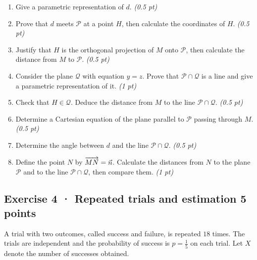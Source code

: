 \begin{enumerate}

\item Give a parametric representation of $d$. \hfill\textit{(0.5 pt)}

\item Prove that $d$ meets $\mathcal P$ at a point $H$, then calculate the coordinates of $H$. \hfill\textit{(0.5 pt)}

\item Justify that $H$ is the orthogonal projection of $M$ onto $\mathcal P$, then calculate the distance from $M$ to $\mathcal P$. \hfill\textit{(0.5 pt)}

\item Consider the plane $\mathcal Q$ with equation $y=z$. Prove that $\mathcal P\cap\mathcal Q$ is a line and give a parametric representation of it. \hfill\textit{(1 pt)}

\item Check that $H\in\mathcal Q$. Deduce the distance from $M$ to the line $\mathcal P\cap\mathcal Q$. \hfill\textit{(0.5 pt)}

\item Determine a Cartesian equation of the plane parallel to $\mathcal P$ passing through $M$. \hfill\textit{(0.5 pt)}

\item Determine the angle between $d$ and the line $\mathcal P\cap\mathcal Q$. \hfill\textit{(0.5 pt)}

\item Define the point $N$ by $\overrightarrow{MN}=\vec n$. Calculate the distances from $N$ to the plane $\mathcal P$ and to the line $\mathcal P\cap\mathcal Q$, then compare them. \hfill\textit{(1 pt)}

\end{enumerate}

\subsection*{Exercise 4 · Repeated trials and estimation \hfill 5 points}A trial with two outcomes, called success and failure, is repeated $18$ times. The trials are independent and the probability of success is $p=\frac{1}{5}$ on each trial. Let $X$ denote the number of successes obtained.


